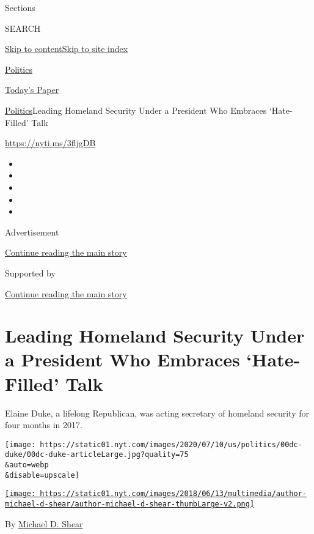 Sections

SEARCH

\protect\hyperlink{site-content}{Skip to
content}\protect\hyperlink{site-index}{Skip to site index}

\href{https://www.nytimes.com/section/politics}{Politics}

\href{https://myaccount.nytimes.com/auth/login?response_type=cookie\&client_id=vi}{}

\href{https://www.nytimes.com/section/todayspaper}{Today's Paper}

\href{/section/politics}{Politics}\textbar{}Leading Homeland Security
Under a President Who Embraces `Hate-Filled' Talk

\url{https://nyti.ms/3fljgDB}

\begin{itemize}
\item
\item
\item
\item
\item
\end{itemize}

Advertisement

\protect\hyperlink{after-top}{Continue reading the main story}

Supported by

\protect\hyperlink{after-sponsor}{Continue reading the main story}

\hypertarget{leading-homeland-security-under-a-president-who-embraces-hate-filled-talk}{%
\section{Leading Homeland Security Under a President Who Embraces
`Hate-Filled'
Talk}\label{leading-homeland-security-under-a-president-who-embraces-hate-filled-talk}}

Elaine Duke, a lifelong Republican, was acting secretary of homeland
security for four months in 2017.

\texttt{[image: https://static01.nyt.com/images/2020/07/10/us/politics/00dc-duke/00dc-duke-articleLarge.jpg?quality=75\\\&auto=webp\\\&disable=upscale]}

\href{https://www.nytimes.com/by/michael-d-shear}{\texttt{[image: https://static01.nyt.com/images/2018/06/13/multimedia/author-michael-d-shear/author-michael-d-shear-thumbLarge-v2.png]}}

By \href{https://www.nytimes.com/by/michael-d-shear}{Michael D. Shear}

